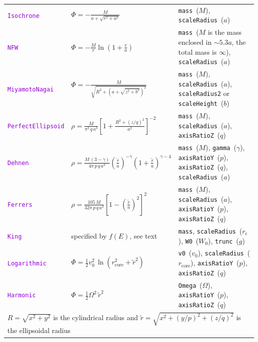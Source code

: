 \documentclass[12pt]{article}
\newcommand{\ttt}[1]{\textcolor{darkviolet}{\texttt{#1}}}
\newcommand{\ppp}[1]{\textcolor{darkolive} {\texttt{#1}}}
\begin{document}
\begin{table}
\begin{tabular}{l m{5cm} >{\raggedright\arraybackslash}m{7cm}}
\ttt{Isochrone} & $\Phi = - \frac{M}{a + \sqrt{r^2 + a^2}}$ & \ppp{mass}~($M$), \ppp{scaleRadius}~($a$) \\[2mm]

\ttt{NFW} & $\Phi = -\frac{M}{r} \ln\left(1 + \frac{r}{a}\right)$ & \ppp{mass}~($M$ {\footnotesize is the mass enclosed in $\sim5.3a$, the total mass is $\infty$}), \ppp{scaleRadius}~($a$) \\[2mm]

\ttt{MiyamotoNagai} & $\Phi = -\frac{M}{\sqrt{R^2 + \left(a + \sqrt{z^2+b^2}\right)^2}}$ & \ppp{mass}~($M$), \ppp{scaleRadius}~($a$), \ppp{scaleRadius2} or \ppp{scaleHeight}~($b$) \\[2mm]

\ttt{PerfectEllipsoid}\!\! & $\rho = \frac{M}{\pi^2\,q\,a^3} \left[ 1 + \frac{R^2+(z/q)^2}{a^2} \right]^{-2}$ &  \ppp{mass}~($M$), \ppp{scaleRadius}~($a$), \ppp{axisRatioZ}~($q$) \\[2mm]

\ttt{Dehnen} & $\rho = \frac{M\,(3-\gamma)}{4\pi\,p\,q\,a^3} \left(\frac{\tilde r}a\right)^{-\gamma} \left(1+\frac{\tilde r}a\right)^{\gamma-4}$\!\! &  \ppp{mass}~($M$), \ppp{gamma}~($\gamma$), \ppp{axisRatioY}~($p$), \ppp{axisRatioZ}~($q$), \ppp{scaleRadius}~($a$) \\[2mm]

\ttt{Ferrers} & $\rho = \frac{105\,M}{32\pi\,p\,q\,a^3} \left[1 - \left(\frac{\tilde r}a\right)^2\right]^2$ & \ppp{mass}~($M$), \ppp{scaleRadius}~($a$), \ppp{axisRatioY}~($p$), \ppp{axisRatioZ}~($q$) \\[2mm]

\ttt{King} & specified by $f(E)$, see text & \ppp{mass}, \ppp{scaleRadius}~($r_\mathrm{c}$), \ppp{W0}~($W_0$), \ppp{trunc}~($g$) \\[2mm]

\ttt{Logarithmic} & $\Phi = \frac{1}{2} v_0^2\,\ln(r_\mathrm{core}^2 + \tilde r^2)$ & \ppp{v0}~($v_0$), \ppp{scaleRadius}~($r_\mathrm{core}$), \ppp{axisRatioY}~($p$), \ppp{axisRatioZ}~($q$) \\[2mm]

\ttt{Harmonic} & $\Phi = \frac{1}{2} \Omega^2\,\tilde r^2$ & \ppp{Omega}~($\Omega$), \ppp{axisRatioY}~($p$), \ppp{axisRatioZ}~($q$) \\[2mm]

\multicolumn{3}{l}{\footnotesize $R=\sqrt{x^2+y^2}$ is the cylindrical radius and $\tilde r=\sqrt{x^2+(y/p)^2+(z/q)^2}$ is the ellipsoidal radius}
\end{tabular}
\end{table}
\end{document}
